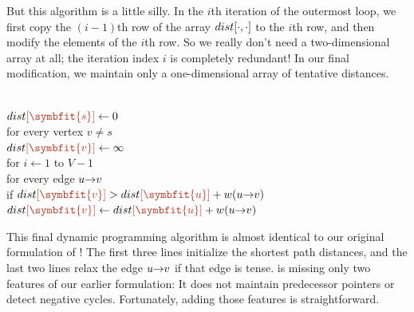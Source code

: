 But this algorithm is a little silly.
In the $i$th iteration of the outermost loop, we first copy the $(i - 1)$th row of the array $dist[\cdot, \cdot]$ to the $i$th row, and then modify the elements of the $i$th row.
So we really don’t need a two-dimensional array at all; the iteration index $i$ is completely redundant!
In our final modification, we maintain only a one-dimensional array of tentative distances.

\begin{pseudocode}
\\
$\Var{dist}{\color{JEred}[\symbfit{s}]} \gets 0$\\
for every vertex $v \neq s$\\
\Indent $\Var{dist}{\color{JEred}[\symbfit{v}]} \gets \infty$\\
for $i \gets 1$ to $V - 1$\\
\Indent for every edge $u\mathord{\rightarrow}v$\\
\Indent\Indent if $\Var{dist}{\color{JEred}[\symbfit{v}]} > \Var{dist}{\color{JEred}[\symbfit{u}]} + w(\arc{u}{v})$\\
\Indent\Indent\Indent $\Var{dist}{\color{JEred}[\symbfit{v}]} \gets \Var{dist}{\color{JEred}[\symbfit{u}]} + w(\arc{u}{v})$
\end{pseudocode}

This final dynamic programming algorithm is almost identical to our original formulation of !
The first three lines initialize the shortest path distances, and the last two lines relax the edge $u\mathord{\rightarrow}v$ if that edge is tense.
 is missing only two features of our earlier formulation: It does not maintain predecessor pointers or detect negative cycles.
Fortunately, adding those features is straightforward.

